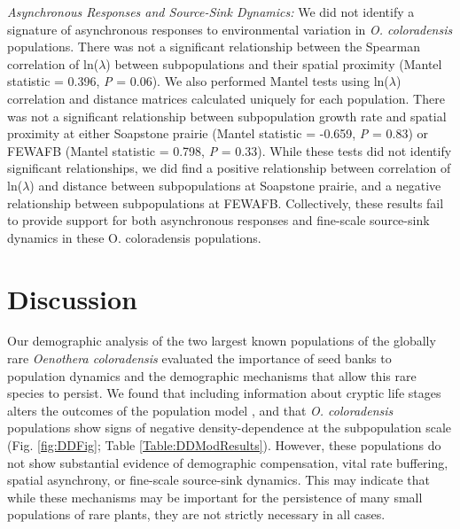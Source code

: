\documentclass[12pt, letterpaper]{article}
\begin{document}
\textit{Asynchronous Responses and Source-Sink Dynamics:} We did not identify a signature of asynchronous responses to environmental variation in \textit{O. coloradensis} populations. There was not a significant relationship between the Spearman correlation of ln($\lambda$) between subpopulations and their spatial proximity (Mantel statistic = 0.396, \textit{P} = 0.06). We also performed Mantel tests using ln($\lambda$) correlation and distance matrices calculated uniquely for each population. There was not a significant relationship between subpopulation growth rate and spatial proximity at either Soapstone prairie (Mantel statistic = -0.659, \textit{P} = 0.83) or FEWAFB (Mantel statistic = 0.798, \textit{P} = 0.33). While these tests did not identify significant relationships, we did find a positive relationship between correlation of ln($\lambda$) and distance between subpopulations at Soapstone prairie, and a negative relationship between subpopulations at FEWAFB. Collectively, these results fail to provide support for both asynchronous responses and fine-scale source-sink dynamics in these O. coloradensis populations. 


\section{Discussion}
\normalfont Our demographic analysis of the two largest known populations of the globally rare \textit{Oenothera coloradensis} evaluated the importance of seed banks to population dynamics and the demographic mechanisms that allow this rare species to persist. We found that including information about cryptic life stages alters the outcomes of the population model \cite{Paniw2017, Nguyen2019ConsequencesModels}, and that \textit{O. coloradensis} populations show signs of negative density-dependence at the subpopulation scale (Fig. \ref{fig:DDFig}; Table \ref{Table:DDModResults}). However, these populations do not show substantial evidence of demographic compensation, vital rate buffering, spatial asynchrony, or fine-scale source-sink dynamics. This may indicate that while these mechanisms may be important for the persistence of many small populations of rare plants, they are not strictly necessary in all cases. 
\end{document}
